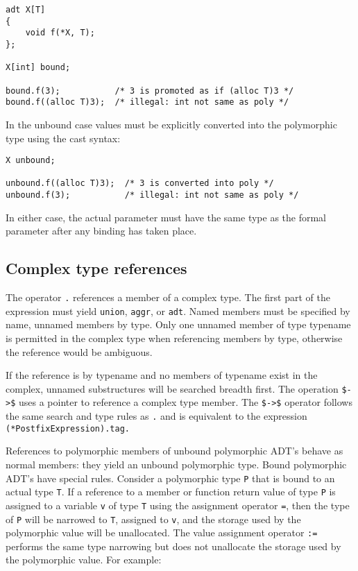 \begin{lstlisting}
adt X[T]
{
    void f(*X, T);
};

X[int] bound;

bound.f(3);           /* 3 is promoted as if (alloc T)3 */
bound.f((alloc T)3);  /* illegal: int not same as poly */
\end{lstlisting}

In the unbound case values must be explicitly converted into the
polymorphic type using the cast syntax:

\begin{lstlisting}
X unbound;

unbound.f((alloc T)3);  /* 3 is converted into poly */
unbound.f(3);           /* illegal: int not same as poly */
\end{lstlisting}

In either case, the actual parameter must have the same type as the
formal parameter after any binding has taken place.

\hypertarget{complex-type-references}{%
\subsection{Complex type references}\label{complex-type-references}}

The operator \passthrough{\lstinline!.!} references a member of a
complex type. The first part of the expression must yield
\passthrough{\lstinline!union!}, \passthrough{\lstinline!aggr!}, or
\passthrough{\lstinline!adt!}. Named members must be specified by name,
unnamed members by type. Only one unnamed member of type typename is
permitted in the complex type when referencing members by type,
otherwise the reference would be ambiguous.

If the reference is by typename and no members of typename exist in the
complex, unnamed substructures will be searched breadth first. The
operation \passthrough{\lstinline!$->$!} uses a pointer to reference a
complex type member. The \passthrough{\lstinline!$->$!} operator follows
the same search and type rules as \passthrough{\lstinline!.!} and is
equivalent to the expression
\passthrough{\lstinline!(*PostfixExpression).tag.!}

References to polymorphic members of unbound polymorphic ADT's behave as
normal members: they yield an unbound polymorphic type. Bound
polymorphic ADT's have special rules. Consider a polymorphic type
\passthrough{\lstinline!P!} that is bound to an actual type
\passthrough{\lstinline!T!}. If a reference to a member or function
return value of type \passthrough{\lstinline!P!} is assigned to a
variable \passthrough{\lstinline!v!} of type \passthrough{\lstinline!T!}
using the assignment operator \passthrough{\lstinline!=!}, then the type
of \passthrough{\lstinline!P!} will be narrowed to
\passthrough{\lstinline!T!}, assigned to \passthrough{\lstinline!v!},
and the storage used by the polymorphic value will be unallocated. The
value assignment operator \passthrough{\lstinline!:=!} performs the same
type narrowing but does not unallocate the storage used by the
polymorphic value. For example:

